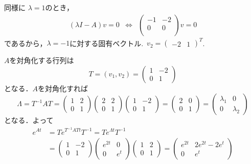 \documentclass[a4paper,11pt,fleqn]{jreport}
\begin{document}
同様に
$\lambda = 1$のとき，
\[
 \begin{array}{ccc}
 (\lambda I - A) v = 0
 &\Leftrightarrow&
 \left(
 \begin{array}{cc}
  -1 & -2 \\
  0 & 0 \\
 \end{array}
 \right) v = 0 
 \end{array}
\]
であるから，$\lambda = -1$に対する固有ベクトル.\
$v_2 = (\begin{array}{cc}-2 & 1\end{array})^T$.

$A$を対角化する行列は
\[
 T=(v_1, v_2)
  =
 \left(
 \begin{array}{cc}
  1 & -2 \\
  0 & 1
 \end{array}
 \right)
\]
となる．$A$を対角化すれば
\[
 \Lambda = T^{-1}AT =
 \left(
 \begin{array}{cc}
  1 & 2 \\
  0 & 1
 \end{array}
 \right)
 \left(
 \begin{array}{cc}
  2 & 2 \\
  0 & 1
 \end{array}
 \right)
 \left(
 \begin{array}{cc}
  1 & -2 \\
  0 & 1
 \end{array}
 \right) =
 \left(
 \begin{array}{cc}
  2 & 0 \\
  0 & 1
 \end{array}
 \right) = 
 \left(
 \begin{array}{cc}
  \lambda_1 & 0 \\
  0 & \lambda_2
 \end{array}
 \right)
\]
となる．よって
\begin{align*}
 e^{At} &= T e^{T^{-1}AT t} T^{-1}
 = T e^{\Lambda t} T^{-1}
\\
 &=
 \left(
 \begin{array}{cc}
  1 & -2 \\
  0 & 1
 \end{array}
 \right)
 \left(
 \begin{array}{cc}
  e^{2t} & 0 \\
  0 & e^{t}
 \end{array}
 \right)
 \left(
 \begin{array}{cc}
  1 & 2 \\
  0 & 1
 \end{array}
 \right)
 =
 \left(
 \begin{array}{cc}
  e^{2t} & 2 e^{2t} - 2 e^{t} \\
  0 & e^{t}
 \end{array}
 \right)
\end{align*}
\end{document}
